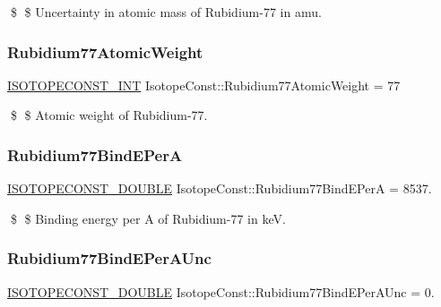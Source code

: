 \$ \$ Uncertainty in atomic mass of Rubidium-\/77 in amu. \mbox{\label{group___isotope_const-_rubidium-_rb77_gab8ed953cdd8b80fdf20aedad697e6695}} 
\subsubsection{\texorpdfstring{Rubidium77\+Atomic\+Weight}{Rubidium77AtomicWeight}}
{\footnotesize\ttfamily \mbox{\hyperlink{group___isotope_const-_macros_ga5f18360b3e99483a35c32d789e62621c}{I\+S\+O\+T\+O\+P\+E\+C\+O\+N\+S\+T\+\_\+\+I\+NT}} Isotope\+Const\+::\+Rubidium77\+Atomic\+Weight = 77}

\$ \$ Atomic weight of Rubidium-\/77. \mbox{\label{group___isotope_const-_rubidium-_rb77_gadd1677f0865a7905f3cc259646c996ad}} 
\subsubsection{\texorpdfstring{Rubidium77\+Bind\+E\+PerA}{Rubidium77BindEPerA}}
{\footnotesize\ttfamily \mbox{\hyperlink{group___isotope_const-_macros_ga8f45a7272ce02c0b4c65c44636ed719a}{I\+S\+O\+T\+O\+P\+E\+C\+O\+N\+S\+T\+\_\+\+D\+O\+U\+B\+LE}} Isotope\+Const\+::\+Rubidium77\+Bind\+E\+PerA = 8537.}

\$ \$ Binding energy per A of Rubidium-\/77 in keV. \mbox{\label{group___isotope_const-_rubidium-_rb77_ga613f8f1abca31869ca1741d2ca2c7a94}} 
\subsubsection{\texorpdfstring{Rubidium77\+Bind\+E\+Per\+A\+Unc}{Rubidium77BindEPerAUnc}}
{\footnotesize\ttfamily \mbox{\hyperlink{group___isotope_const-_macros_ga8f45a7272ce02c0b4c65c44636ed719a}{I\+S\+O\+T\+O\+P\+E\+C\+O\+N\+S\+T\+\_\+\+D\+O\+U\+B\+LE}} Isotope\+Const\+::\+Rubidium77\+Bind\+E\+Per\+A\+Unc = 0.}

